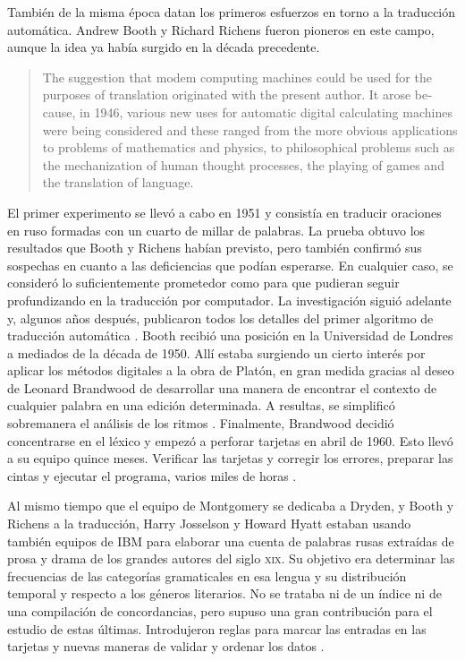 También de la misma época datan los primeros esfuerzos en torno a la traducción automática. Andrew Booth y Richard Richens fueron pioneros en este campo, aunque la idea ya había surgido en la década precedente.
\blockquote{\begin{english}The suggestion that modem computing machines could be used for the purposes of translation originated with the present author. It arose because, in 1946, various new 	uses for automatic digital calculating machines were being considered and these ranged from the more obvious applications to problems of mathematics and physics, to philosophical problems such as the mechanization of human thought processes, the playing of games and the translation of language.\end{english} \parencite[88]{booth1958}}
El primer experimento se llevó a cabo en 1951 y consistía en traducir oraciones en ruso formadas con un cuarto de millar de palabras. La prueba obtuvo los resultados que Booth y Richens habían previsto, pero también confirmó sus sospechas en cuanto a las deficiencias que podían esperarse. En cualquier caso, se consideró lo suficientemente prometedor como para que pudieran seguir profundizando en la traducción por computador. La investigación siguió adelante y, algunos años después, publicaron todos los detalles del primer algoritmo de traducción automática \parencite{richens1955}. Booth recibió una posición en la Universidad de Londres a mediados de la década de 1950. Allí estaba surgiendo un cierto interés por aplicar los métodos digitales a la obra de Platón, en gran medida gracias al deseo de Leonard Brandwood de desarrollar una manera de encontrar el contexto de cualquier palabra en una edición determinada. A resultas, se simplificó sobremanera el análisis de los ritmos \parencite[46-49]{brandwood1956}. Finalmente, Brandwood decidió concentrarse en el léxico y empezó a perforar tarjetas en abril de 1960. Esto llevó a su equipo quince meses. Verificar las tarjetas y corregir los errores, preparar las cintas y ejecutar el programa, varios miles de horas \autocite[6]{burton1981}.
  
Al mismo tiempo que el equipo de Montgomery se dedicaba a Dryden, y Booth y Richens a la traducción,  Harry Josselson y Howard Hyatt estaban usando también equipos de IBM para elaborar una cuenta de palabras rusas \parencite{josselson1953} extraídas de prosa y drama de los grandes autores del siglo \textsc{xix}. Su objetivo era determinar las frecuencias de las categorías gramaticales en esa lengua y su distribución temporal y respecto a los géneros literarios. No se trataba ni de un índice ni de una compilación de concordancias, pero supuso una gran contribución para el estudio de estas últimas. Introdujeron reglas para marcar las entradas en las tarjetas y nuevas maneras de validar y ordenar los datos \autocite[4-5]{burton1981}.

